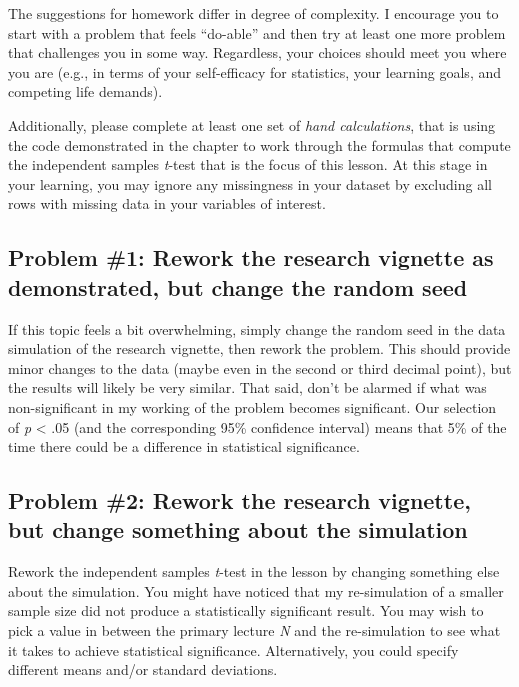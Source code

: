 \documentclass[
  11pt,
]{book}
\begin{document}
The suggestions for homework differ in degree of complexity. I encourage you to start with a problem that feels ``do-able'' and then try at least one more problem that challenges you in some way. Regardless, your choices should meet you where you are (e.g., in terms of your self-efficacy for statistics, your learning goals, and competing life demands).

Additionally, please complete at least one set of \emph{hand calculations}, that is using the code demonstrated in the chapter to work through the formulas that compute the independent samples \emph{t}-test that is the focus of this lesson. At this stage in your learning, you may ignore any missingness in your dataset by excluding all rows with missing data in your variables of interest.

\hypertarget{problem-1-rework-the-research-vignette-as-demonstrated-but-change-the-random-seed-1}{%
\subsection{Problem \#1: Rework the research vignette as demonstrated, but change the random seed}\label{problem-1-rework-the-research-vignette-as-demonstrated-but-change-the-random-seed-1}}

If this topic feels a bit overwhelming, simply change the random seed in the data simulation of the research vignette, then rework the problem. This should provide minor changes to the data (maybe even in the second or third decimal point), but the results will likely be very similar. That said, don't be alarmed if what was non-significant in my working of the problem becomes significant. Our selection of \emph{p} \textless{} .05 (and the corresponding 95\% confidence interval) means that 5\% of the time there could be a difference in statistical significance.

\hypertarget{problem-2-rework-the-research-vignette-but-change-something-about-the-simulation-1}{%
\subsection{Problem \#2: Rework the research vignette, but change something about the simulation}\label{problem-2-rework-the-research-vignette-but-change-something-about-the-simulation-1}}

Rework the independent samples \emph{t}-test in the lesson by changing something else about the simulation. You might have noticed that my re-simulation of a smaller sample size did not produce a statistically significant result. You may wish to pick a value in between the primary lecture \emph{N} and the re-simulation to see what it takes to achieve statistical significance. Alternatively, you could specify different means and/or standard deviations.
\end{document}
